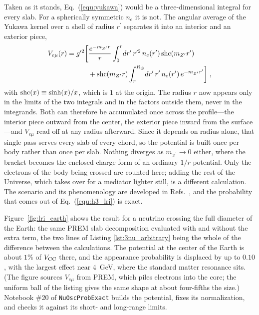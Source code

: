 \documentclass[final,5p,times,twocolumn,sort,compress]{elsarticle}
\newcommand{\eq}{Eq.}
\newcommand{\Refs}{Refs.}
\newcommand{\equ}[1]{\eq~(\ref{equ:#1})}
\begin{document}
Taken as it stands, \equ{yukawa} would be a three-dimensional integral for every slab.  For a spherically symmetric $n_e$ it is not.  The angular average of the Yukawa kernel over a shell of radius $r^\prime$ separates it into an interior and an exterior piece,
\begin{equation}
 \label{equ:yukawa_radial}
 \begin{split}
  V_{e\mu}(r)
  =
  g^{\prime 2} \bigg[
  &\frac{e^{-m_{Z^\prime} r}}{r}
  \int_0^r \! dr^\prime \, r^{\prime 2} \, n_e(r^\prime) \,
  {\rm shc}\!\left(m_{Z^\prime} r^\prime\right) \\
  &+ {\rm shc}\!\left(m_{Z^\prime} r\right)
  \int_r^{R_\oplus} \! dr^\prime \, r^\prime \, n_e(r^\prime) \,
  e^{-m_{Z^\prime} r^\prime} \bigg] \;,
 \end{split}
\end{equation}
with ${\rm shc}(x) \equiv \sinh(x)/x$, which is $1$ at the origin.  The radius $r$ now appears only in the limits of the two integrals and in the factors outside them, never in the integrands.  Both can therefore be accumulated once across the profile---the interior piece outward from the center, the exterior piece inward from the surface---and $V_{e\mu}$ read off at any radius afterward.  Since it depends on radius alone, that single pass serves every slab of every chord, so the potential is built once per body rather than once per slab.  Nothing diverges as $m_{Z^\prime} \to 0$ either, where the bracket becomes the enclosed-charge form of an ordinary $1/r$ potential.  Only the electrons of the body being crossed are counted here; adding the rest of the Universe, which takes over for a mediator lighter still, is a different calculation.  The scenario and its phenomenology are developed in \Refs\ \cite{Joshipura:2003jh, Bandyopadhyay:2006uh, Bustamante:2018mzu, Agarwalla:2024ylc}, and the probability that comes out of \equ{h3_lri} is exact.

Figure~\ref{fig:lri_earth} shows the result for a neutrino crossing the full diameter of the Earth: the same PREM slab decomposition evaluated with and without the extra term, the two lines of Listing \ref{lst:3nu_arbitrary} being the whole of the difference between the calculations.  The potential at the center of the Earth is about $1\%$ of $V_{\rm CC}$ there, and the appearance probability is displaced by up to $0.10$, with the largest effect near $4$~GeV, where the standard matter resonance sits.  (The figure sources $V_{e\mu}$ from PREM, which piles electrons into the core; the uniform ball of the listing gives the same shape at about four-fifths the size.)  Notebook \#20 of {\tt NuOscProbExact} builds the potential, fixes its normalization, and checks it against its short- and long-range limits.
\end{document}
